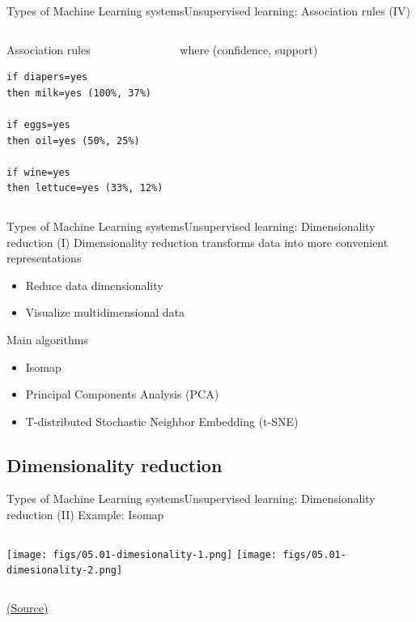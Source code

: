 \documentclass[10pt,compress]{beamer} %
\begin{document}
\begin{frame}[fragile]{Types of Machine Learning systems}{Unsupervised learning: Association rules (IV)}
    \begin{columns}
	   		\begin{exampleblock}{Association rules}
\begin{lstlisting}[firstnumber=1, xleftmargin=10pt] 
if diapers=yes
then milk=yes (100%, 37%)

if eggs=yes
then oil=yes (50%, 25%)

if wine=yes
then lettuce=yes (33%, 12%)
\end{lstlisting}
	   		\end{exampleblock}

 		where (confidence, support)
	\end{columns}
\end{frame}

\begin{frame}{Types of Machine Learning systems}{Unsupervised learning: Dimensionality reduction (I)}
	Dimensionality reduction transforms data into more convenient representations
	\begin{itemize}
		\item Reduce data dimensionality
		\item Visualize multidimensional data
	\end{itemize}

	Main algorithms
	\begin{itemize}
		\item Isomap
		\item Principal Components Analysis (PCA)
		\item T-distributed Stochastic Neighbor Embedding (t-SNE)
	\end{itemize}
\end{frame}

\subsection{Dimensionality reduction}
\begin{frame}[fragile]{Types of Machine Learning systems}{Unsupervised learning: Dimensionality reduction (II)}
	Example: Isomap

    \begin{columns}
			\texttt{[image: figs/05.01-dimesionality-1.png]}
			\texttt{[image: figs/05.01-dimesionality-2.png]}
    \end{columns}
    \centering \tiny{\href{https://jakevdp.github.io/PythonDataScienceHandbook/05.01-what-is-machine-learning.html}{(Source)}}

\end{frame}
\end{document}
